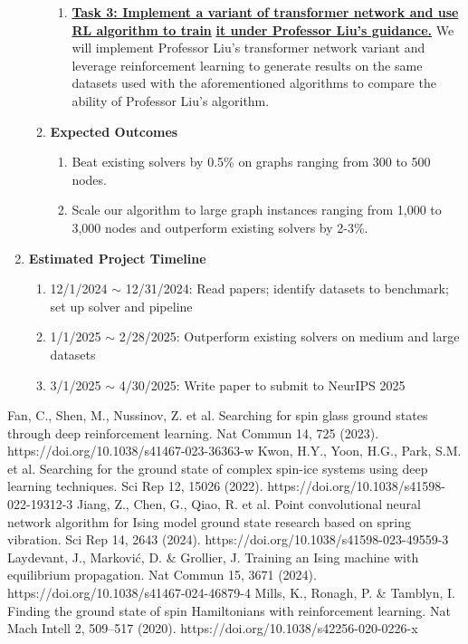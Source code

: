 \documentclass{article}
\begin{document}
\begin{enumerate}
\begin{enumerate}
\begin{enumerate}
		\item \textbf{\underline{Task 3: Implement a variant of transformer network and use RL algorithm to train}}
		\newline
		\textbf{\underline{it under Professor Liu's guidance.}} We will implement Professor Liu's transformer network variant and leverage reinforcement learning to generate results on the same datasets used with the aforementioned algorithms to compare the ability of Professor Liu's algorithm.

	\end{enumerate}

	\item \textbf{Expected Outcomes}
	
	\begin{enumerate}
		\item Beat existing solvers by 0.5\% on graphs ranging from 300 to 500 nodes.
		\item Scale our algorithm to large graph instances ranging from 1,000 to 3,000 nodes and outperform existing solvers by 2-3\%.
	\end{enumerate}

\end{enumerate}

\item \textbf{Estimated Project Timeline}
\begin{enumerate}
	\item 12/1/2024 $\sim$ 12/31/2024: Read papers; identify datasets to benchmark; set up solver and pipeline
	\item 1/1/2025 $\sim$ 2/28/2025: Outperform existing solvers on medium and large datasets
	\item 3/1/2025 $\sim$ 4/30/2025: Write paper to submit to NeurIPS 2025
\end{enumerate}

\end{enumerate}

\begin{thebibliography}{00}
Fan, C., Shen, M., Nussinov, Z. et al. Searching for spin glass ground states through deep reinforcement learning. Nat Commun 14, 725 (2023). https://doi.org/10.1038/s41467-023-36363-w
Kwon, H.Y., Yoon, H.G., Park, S.M. et al. Searching for the ground state of complex spin-ice systems using deep learning techniques. Sci Rep 12, 15026 (2022). https://doi.org/10.1038/s41598-022-19312-3
Jiang, Z., Chen, G., Qiao, R. et al. Point convolutional neural network algorithm for Ising model ground state research based on spring vibration. Sci Rep 14, 2643 (2024). https://doi.org/10.1038/s41598-023-49559-3
Laydevant, J., Marković, D. \& Grollier, J. Training an Ising machine with equilibrium propagation. Nat Commun 15, 3671 (2024). https://doi.org/10.1038/s41467-024-46879-4
Mills, K., Ronagh, P. \& Tamblyn, I. Finding the ground state of spin Hamiltonians with reinforcement learning. Nat Mach Intell 2, 509–517 (2020). https://doi.org/10.1038/s42256-020-0226-x


\end{thebibliography}
\end{document}
